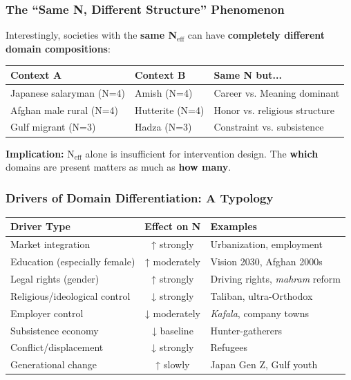 \subsubsection{The ``Same N, Different Structure'' Phenomenon}

Interestingly, societies with the \textbf{same N$_{\text{eff}}$} can have \textbf{completely different domain compositions}:

\begin{center}
\begin{tabular}{@{}lll@{}}
\toprule
\textbf{Context A} & \textbf{Context B} & \textbf{Same N but...} \\
\midrule
Japanese salaryman (N=4) & Amish (N=4) & Career vs. Meaning dominant \\
Afghan male rural (N=4) & Hutterite (N=4) & Honor vs. religious structure \\
Gulf migrant (N=3) & Hadza (N=3) & Constraint vs. subsistence \\
\bottomrule
\end{tabular}
\end{center}

\textbf{Implication:} N$_{\text{eff}}$ alone is insufficient for intervention design. The \textbf{which} domains are present matters as much as \textbf{how many}.

\subsubsection{Drivers of Domain Differentiation: A Typology}

\begin{center}
\begin{tabular}{@{}lcp{6cm}@{}}
\toprule
\textbf{Driver Type} & \textbf{Effect on N} & \textbf{Examples} \\
\midrule
Market integration & ↑ strongly & Urbanization, employment \\
Education (especially female) & ↑ moderately & Vision 2030, Afghan 2000s \\
Legal rights (gender) & ↑ strongly & Driving rights, \textit{mahram} reform \\
Religious/ideological control & ↓ strongly & Taliban, ultra-Orthodox \\
Employer control & ↓ moderately & \textit{Kafala}, company towns \\
Subsistence economy & ↓ baseline & Hunter-gatherers \\
Conflict/displacement & ↓ strongly & Refugees \\
Generational change & ↑ slowly & Japan Gen Z, Gulf youth \\
\bottomrule
\end{tabular}
\end{center}

